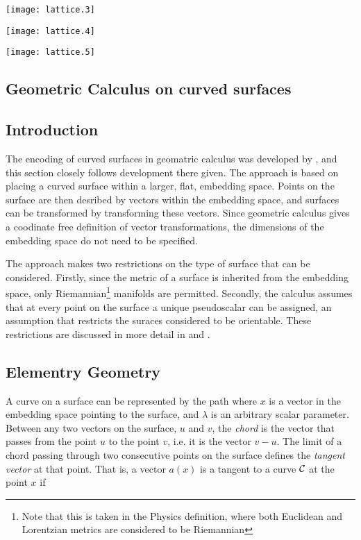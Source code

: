 \texttt{[image: lattice.3]}

\texttt{[image: lattice.4]}

\texttt{[image: lattice.5]}

\subsection{Geometric Calculus on curved surfaces}

\subsection{Introduction}
The encoding of curved surfaces in geomatric calculus was developed by
\cite{Hestenes1984}, and this section closely follows development
there given.
The approach is based on placing a curved surface within a larger, flat, embedding space.
Points on the surface are then desribed by vectors within the
embedding space, and surfaces can be transformed by transforming these
vectors.
Since geometric calculus gives a coodinate free definition of vector
transformations,
the dimensions of the embedding space do not need to be specified.

The approach makes two restrictions on the type of surface that can
be considered. 
Firstly, since the metric of a surface is inherited from the embedding
space,
only Riemannian\footnote{Note that this is taken in the Physics
  definition, where both Euclidean and Lorentzian metrics are
  considered to be Riemannian} manifolds are permitted.
Secondly, the calculus assumes that at every point on the surface a unique
pseudoscalar can be assigned, an assumption that restricts the suraces
considered to be orientable.  These restrictions are discussed in
more detail in \cite{Hestenes1984} and \cite{Doran2003}.

\subsection{Elementry Geometry}

A curve on a surface can be represented by the path
where $x$ is a vector in the embedding space pointing to the surface,
and $\lambda$ is an arbitrary scalar parameter.
Between any two vectors on the surface,  $u$ and $v$,
the {\em chord} is the vector that passes from the point $u$ to the
point $v$, i.e. it is the vector $v - u$.
The limit of a chord passing
through two consecutive points on the surface defines the {\em tangent
  vector} at that point.
That is, a vector $a(x)$ is a tangent to a curve ${\cal C}$ at the point $x$ if

